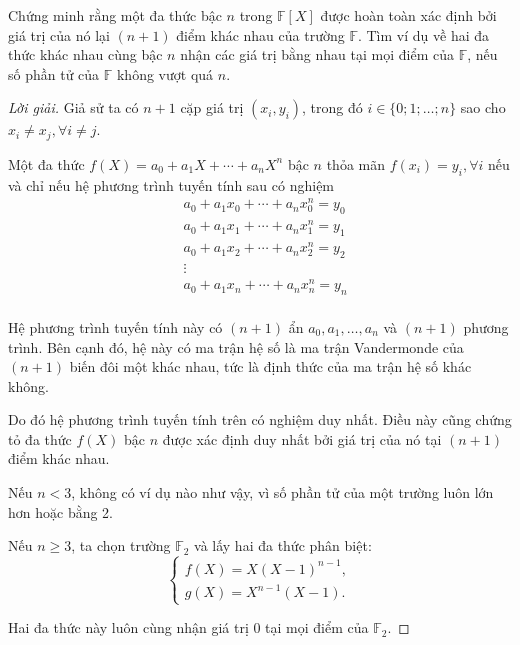 \documentclass[class=nhvh-linear-algebra,crop=false]{standalone}
\begin{document}
\begin{exercise}
    \par Chứng minh rằng một đa thức bậc $n$ trong $\mathbb{F}[X]$ được hoàn toàn xác định bởi giá trị của nó lại $(n+1)$ điểm khác nhau của trường $\mathbb{F}$. Tìm ví dụ về hai đa thức khác nhau cùng bậc $n$ nhận các giá trị bằng nhau tại mọi điểm của $\mathbb{F}$, nếu số phần tử của $\mathbb{F}$ không vượt quá $n$.
\end{exercise}

\begin{proof}[Lời giải]
    \par Giả sử ta có $n + 1$ cặp giá trị $(x_{i}, y_{i})$, trong đó $i \in \{ 0; 1; \ldots; n \}$ sao cho $x_{i} \ne x_{j}, \forall i\ne j$.
    \par Một đa thức $f(X) = a_{0} + a_{1}X + \cdots + a_{n}X^{n}$ bậc $n$ thỏa mãn $f(x_{i}) = y_{i}, \forall i$ nếu và chỉ nếu hệ phương trình tuyến tính sau có nghiệm
    \begin{align*}
         & a_{0} + a_{1}x_{0} + \cdots + a_{n}x_{0}^{n} = y_{0} \\
         & a_{0} + a_{1}x_{1} + \cdots + a_{n}x_{1}^{n} = y_{1} \\
         & a_{0} + a_{1}x_{2} + \cdots + a_{n}x_{2}^{n} = y_{2} \\
         & \vdots                                               \\
         & a_{0} + a_{1}x_{n} + \cdots + a_{n}x_{n}^{n} = y_{n} \\
    \end{align*}
    \par Hệ phương trình tuyến tính này có $(n+1)$ ẩn $a_{0}, a_{1}, \ldots, a_{n}$ và $(n+1)$ phương trình. Bên cạnh đó, hệ này có ma trận hệ số là ma trận Vandermonde của $(n+1)$ biến đôi một khác nhau, tức là định thức của ma trận hệ số khác không.
    \par Do đó hệ phương trình tuyến tính trên có nghiệm duy nhất. Điều này cũng chứng tỏ đa thức $f(X)$ bậc $n$ được xác định duy nhất bởi giá trị của nó tại $(n+1)$ điểm khác nhau.
    \bigskip
    \bigskip
    \par Nếu $n < 3$, không có ví dụ nào như vậy, vì số phần tử của một trường luôn lớn hơn hoặc bằng 2.
    \par Nếu $n\ge 3$, ta chọn trường $\mathbb{F}_{2}$ và lấy hai đa thức phân biệt:
    \[
        \begin{cases}
            f(X) = X{(X-1)}^{n-1}, \\
            g(X) = X^{n-1}(X-1).
        \end{cases}
    \]
    \par Hai đa thức này luôn cùng nhận giá trị 0 tại mọi điểm của $\mathbb{F}_{2}$.
\end{proof}
\end{document}
